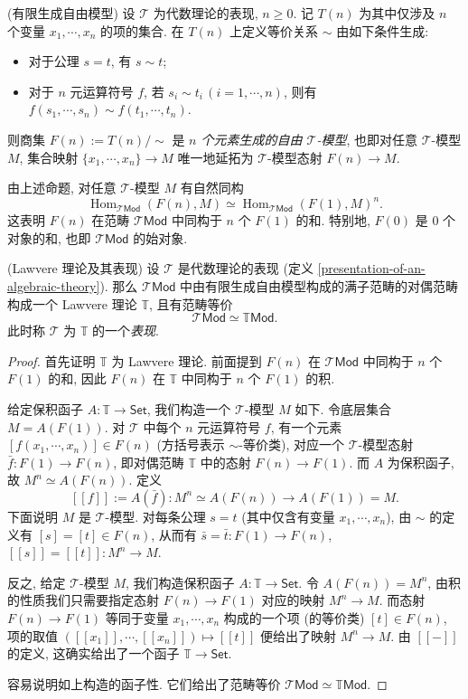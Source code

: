 \begin{propdef}
	[label={finitely-generated-free-model}]
	{(有限生成自由模型)}
	设 $\mathcal T$ 为代数理论的表现, $n\geq 0$. 记 $T(n)$ 为其中仅涉及 $n$ 个变量 $x_1,\cdots,x_n$ 的项的集合. 在 $T(n)$ 上定义等价关系 $\sim$ 由如下条件生成:
	\begin{itemize}
		\item 对于公理 $s=t$, 有 $s\sim t$;
		\item 对于 $n$ 元运算符号 $f$, 若 $s_i\sim t_i\,(i=1,\cdots,n)$, 则有 $f(s_1,\cdots,s_n)\sim f(t_1,\cdots,t_n)$.
	\end{itemize}
	则商集 $F(n):=T(n)/\sim$ 是 \emph{$n$ 个元素生成的自由 $\mathcal T$-模型}, 也即对任意 $\mathcal T$-模型 $M$, 集合映射 $\{x_1,\cdots,x_n\}\to M$ 唯一地延拓为 $\mathcal T$-模型态射 $F(n)\to M$.
\end{propdef}

由上述命题, 对任意 $\mathcal T$-模型 $M$ 有自然同构
\[
\operatorname{Hom}_{\mathcal T\mathsf {Mod}}(F(n),M)\simeq \operatorname{Hom}_{\mathcal T\mathsf {Mod}}(F(1),M)^n.
\]
这表明 $F(n)$ 在范畴 $\mathcal T\mathsf {Mod}$ 中同构于 $n$ 个 $F(1)$ 的和. 特别地, $F(0)$ 是 $0$ 个对象的和, 也即 $\mathcal T\mathsf {Mod}$ 的始对象.

\begin{propdef}
	{(Lawvere 理论及其表现)}
	设 $\mathcal T$ 是代数理论的表现 (定义 \ref{presentation-of-an-algebraic-theory}). 那么 $\mathcal T\mathsf {Mod}$ 中由有限生成自由模型构成的满子范畴的对偶范畴构成一个 Lawvere 理论 $\mathbb T$, 且有范畴等价\[\mathcal T\mathsf {Mod} \simeq \mathbb T\mathsf {Mod}.\]
	此时称 $\mathcal T$ 为 $\mathbb T$ 的一个\emph{表现}.
\end{propdef}
\begin{proof}
	首先证明 $\mathbb T$ 为 Lawvere 理论.
	前面提到 $F(n)$ 在 $\mathcal T\mathsf {Mod}$ 中同构于 $n$ 个 $F(1)$ 的和, 因此 $F(n)$ 在 $\mathbb T$ 中同构于 $n$ 个 $F(1)$ 的积.
	
	给定保积函子 $A\colon \mathbb T\to\mathsf {Set}$, 我们构造一个 $\mathcal T$-模型 $M$ 如下.
	令底层集合 $M=A(F(1))$. 对 $\mathcal T$ 中每个 $n$ 元运算符号 $f$, 有一个元素 $[f(x_1,\cdots,x_n)]\in F(n)$ (方括号表示 $\sim$-等价类), 对应一个 $\mathcal T$-模型态射 $\bar{f}\colon F(1)\to F(n)$, 即对偶范畴 $\mathbb T$ 中的态射 $F(n)\to F(1)$. 而 $A$ 为保积函子, 故 $M^n\simeq A(F(n))$. 定义
	$$
	[[f]] := A(\bar f)\colon M^n\simeq A(F(n)) \to A(F(1)) = M.
	$$
	下面说明 $M$ 是 $\mathcal T$-模型.
	对每条公理 $s=t$ (其中仅含有变量 $x_1,\cdots,x_n$),
	由 $\sim$ 的定义有 $[s]=[t]\in F(n)$, 从而有 $\bar s = \bar t\colon F(1)\to F(n)$, $[[s]]=[[t]]\colon M^n\to M$.
	
	反之, 给定 $\mathcal T$-模型 $M$, 我们构造保积函子 $A\colon \mathbb T\to\mathsf {Set}$.
	令 $A(F(n)) = M^n$, 由积的性质我们只需要指定态射 $F(n)\to F(1)$ 对应的映射 $M^n\to M$.
	而态射 $F(n)\to F(1)$ 等同于变量 $x_1,\cdots,x_n$ 构成的一个项 (的等价类) $[t]\in F(n)$, 项的取值 $([[x_1]],\cdots,[[x_n]])\mapsto [[t]]$ 便给出了映射 $M^n\to M$. 由 $[[-]]$ 的定义, 这确实给出了一个函子 $\mathbb T\to\mathsf {Set}$.
	
	容易说明如上构造的函子性. 它们给出了范畴等价 $\mathcal T\mathsf {Mod} \simeq \mathbb T\mathsf {Mod}$.
\end{proof}

